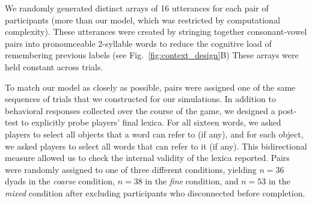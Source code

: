 We randomly generated distinct arrays of 16 utterances for each pair of participants (more than our model, which was restricted by computational complexity).
These utterances were created by stringing together consonant-vowel pairs into pronounceable 2-syllable words to reduce the cognitive load of remembering previous labels (see Fig.~\ref{fig:context_design}B)
These arrays were held constant across trials.

To match our model as closely as possible, pairs were assigned one of the same sequences of trials that we constructed for our simulations. 
In addition to behavioral responses collected over the course of the game, we designed a post-test to explicitly probe players' final lexica. For all sixteen words, we asked players to select all objects that a word can refer to (if any), and for each object, we asked players to select all words that can refer to it (if any). 
This bidirectional measure allowed us to check the internal validity of the lexica reported.
Pairs were randomly assigned to one of three different conditions, yielding $n=36$ dyads in the \emph{coarse} condition, $n=38$ in the \emph{fine} condition, and $n=53$ in the \emph{mixed} condition after excluding participants who disconnected before completion.

